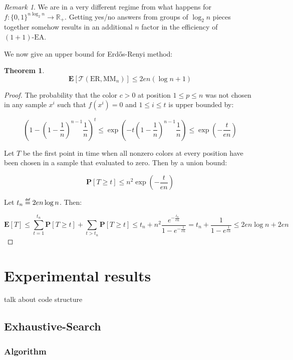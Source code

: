 \documentclass[12pt]{article}
\theoremstyle{definition}
\theoremstyle{plain}
\newtheorem*{theorem}{Theorem}
\theoremstyle{remark}
\newtheorem*{remark}{Remark}
\newcommand\mydef{\mathrel{\overset{\makebox[0pt]{\mbox{\normalfont\tiny\sffamily def}}}{=}}}
\begin{document}
\begin{remark}
    We are in a very different regime from what happens for $f:\{0,1\}^{n \log_2 n}\to \mathbb{R}_+$. Getting yes/no
    answers from groups of $\log_2 n$ pieces together somehow results in an additional $n$ factor in the efficiency of $(1+1)\text{-EA}$.
\end{remark}

We now give an upper bound for Erd\H{o}s-Renyi method:

\begin{theorem}
    $$\mathbf{E}[\mathcal{T}(\text{ER}, \text{MM}_n)]\le 2en(\log n+1)$$
\end{theorem}

\begin{proof}
    The probability that the color $c>0$ at position $1\le p\le n$
    was not chosen in any sample $x^i$ such that $f(x^i)=0$ and $1\le i\le t$
    is upper bounded by:

    $$\left(1-\left(1-\frac{1}{n}\right)^{n-1}\frac{1}{n}\right)^t\le \exp\left(-t\left(1-\frac{1}{n}\right)^{n-1}\frac{1}{n}\right)\le\exp\left(-\frac{t}{en}\right)$$

    Let $T$ be the first point in time when all nonzero colors at every position have
    been chosen in a sample that evaluated to zero. Then by a union bound:

    $$\mathbf{P}[T\ge t]\le n^2 \exp\left(-\frac{t}{en}\right)$$

    Let $t_n\mydef 2en\log n$. Then:

    $$\mathbf{E}[T]\le \sum_{t=1}^{t_n} \mathbf{P}[T\ge t] +\sum_{t>t_n} \mathbf{P}[T\ge t]
    \le t_n+n^2 \frac{e^{-\frac{t_n}{en}}}{1-e^{-\frac{1}{en}}}= t_n+\frac{1}{1-e^{\frac{1}{en}}}\le 2en\log n+2en$$\qedhere

\end{proof}

\section{Experimental results}

talk about code structure 

\subsection{Exhaustive-Search}
\subsubsection{Algorithm}
\end{document}
